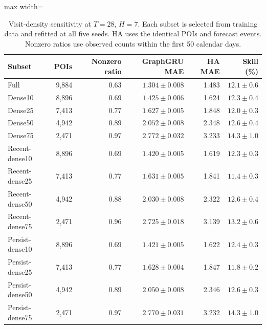 \begin{table}[!htbp]
\centering
\begingroup
\singlespacing
\fontsize{9pt}{10.5pt}\selectfont
\setlength{\tabcolsep}{4pt}
\renewcommand{\arraystretch}{1.08}
\caption{Visit-density sensitivity at $T=28$, $H=7$. Each subset is selected from training data and refitted at all five seeds. HA uses the identical POIs and forecast events. Nonzero ratios use observed counts within the first 50 calendar days.}
\label{tab:sublevel}
\begin{adjustbox}{max width=\linewidth}
\begin{tabular}{lrrrrr}
\toprule
Subset & POIs & Nonzero ratio & GraphGRU MAE & HA MAE & Skill (\%) \\
\midrule
Full & 9,884 & 0.63 & $1.304\pm 0.008$ & 1.483 & $12.1\pm 0.6$ \\
Dense10 & 8,896 & 0.69 & $1.425\pm 0.006$ & 1.624 & $12.3\pm 0.4$ \\
Dense25 & 7,413 & 0.77 & $1.627\pm 0.005$ & 1.848 & $12.0\pm 0.3$ \\
Dense50 & 4,942 & 0.89 & $2.052\pm 0.008$ & 2.348 & $12.6\pm 0.4$ \\
Dense75 & 2,471 & 0.97 & $2.772\pm 0.032$ & 3.233 & $14.3\pm 1.0$ \\
Recent-dense10 & 8,896 & 0.69 & $1.420\pm 0.005$ & 1.619 & $12.3\pm 0.3$ \\
Recent-dense25 & 7,413 & 0.77 & $1.631\pm 0.005$ & 1.841 & $11.4\pm 0.3$ \\
Recent-dense50 & 4,942 & 0.88 & $2.030\pm 0.008$ & 2.322 & $12.6\pm 0.4$ \\
Recent-dense75 & 2,471 & 0.96 & $2.725\pm 0.018$ & 3.139 & $13.2\pm 0.6$ \\
Persist-dense10 & 8,896 & 0.69 & $1.421\pm 0.005$ & 1.622 & $12.4\pm 0.3$ \\
Persist-dense25 & 7,413 & 0.77 & $1.628\pm 0.004$ & 1.847 & $11.8\pm 0.2$ \\
Persist-dense50 & 4,942 & 0.89 & $2.050\pm 0.008$ & 2.346 & $12.6\pm 0.3$ \\
Persist-dense75 & 2,471 & 0.97 & $2.770\pm 0.031$ & 3.232 & $14.3\pm 1.0$ \\
\bottomrule
\end{tabular}
\end{adjustbox}
\endgroup
\end{table}
